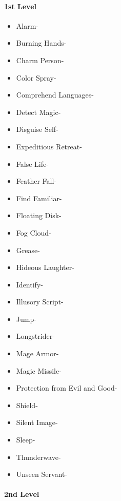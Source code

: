 \documentclass[
]{article}
\providecommand{\tightlist}{%
  \setlength{\itemsep}{0pt}\setlength{\parskip}{0pt}}
\begin{document}
\hypertarget{1st-level-7}{%
\paragraph{1st Level}\label{1st-level-7}}

\begin{itemize}
\tightlist
\item
  Alarm-
\item
  Burning Hands-
\item
  Charm Person-
\item
  Color Spray-
\item
  Comprehend Languages-
\item
  Detect Magic-
\item
  Disguise Self-
\item
  Expeditious Retreat-
\item
  False Life-
\item
  Feather Fall-
\item
  Find Familiar-
\item
  Floating Disk-
\item
  Fog Cloud-
\item
  Grease-
\item
  Hideous Laughter-
\item
  Identify-
\item
  Illusory Script-
\item
  Jump-
\item
  Longstrider-
\item
  Mage Armor-
\item
  Magic Missile-
\item
  Protection from Evil and Good-
\item
  Shield-
\item
  Silent Image-
\item
  Sleep-
\item
  Thunderwave-
\item
  Unseen Servant-
\end{itemize}

\hypertarget{2nd-level-7}{%
\paragraph{2nd Level}\label{2nd-level-7}}
\end{document}
